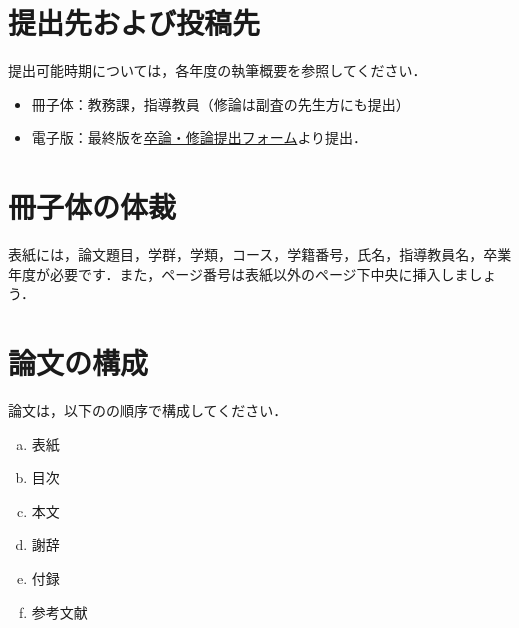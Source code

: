 \documentclass[12pt]{kupaper}
\begin{document}
\chapter{提出先および投稿先}
提出可能時期については，各年度の執筆概要を参照してください．
	\begin{itemize}
		\item 冊子体：教務課，指導教員（修論は副査の先生方にも提出）
		\item 電子版：最終版を\href{https://forms.gle/ZUT2Erq8iPRBpF4q9}{卒論・修論提出フォーム}より提出．
	\end{itemize}

\chapter{冊子体の体裁}
表紙には，論文題目，学群，学類，コース，学籍番号，氏名，指導教員名，卒業年度が必要です．また，ページ番号は表紙以外のページ下中央に挿入しましょう．

\chapter{論文の構成}\label{chap:論文の構成}
論文は，以下のの順序で構成してください．

	\begin{enumerate}[a.]
		\item 表紙 \label{term:a}
		\item 目次 \label{term:b}
		\item 本文 \label{term:c}
		\item 謝辞 \label{term:d}
		\item 付録 \label{term:e}
		\item 参考文献 \label{term:f}
	\end{enumerate}
\end{document}
